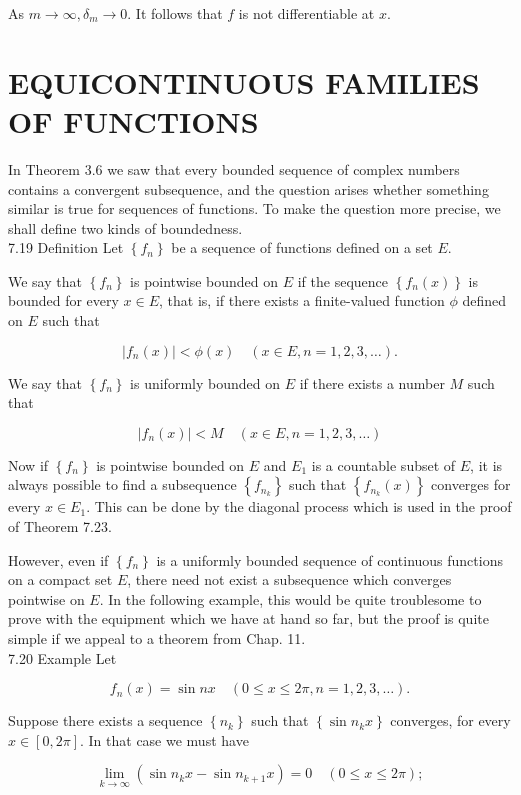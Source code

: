 \documentclass[10pt]{article}
\begin{document}
As $m \rightarrow \infty, \delta_{m} \rightarrow 0$. It follows that $f$ is not differentiable at $x$.

\section*{EQUICONTINUOUS FAMILIES OF FUNCTIONS}
In Theorem 3.6 we saw that every bounded sequence of complex numbers contains a convergent subsequence, and the question arises whether something similar is true for sequences of functions. To make the question more precise, we shall define two kinds of boundedness.\\
7.19 Definition Let $\left\{f_{n}\right\}$ be a sequence of functions defined on a set $E$.

We say that $\left\{f_{n}\right\}$ is pointwise bounded on $E$ if the sequence $\left\{f_{n}(x)\right\}$ is bounded for every $x \in E$, that is, if there exists a finite-valued function $\phi$ defined on $E$ such that

$$
\left|f_{n}(x)\right|<\phi(x) \quad(x \in E, n=1,2,3, \ldots) .
$$

We say that $\left\{f_{n}\right\}$ is uniformly bounded on $E$ if there exists a number $M$ such that

$$
\left|f_{n}(x)\right|<M \quad(x \in E, n=1,2,3, \ldots)
$$

Now if $\left\{f_{n}\right\}$ is pointwise bounded on $E$ and $E_{1}$ is a countable subset of $E$, it is always possible to find a subsequence $\left\{f_{n_{k}}\right\}$ such that $\left\{f_{n_{k}}(x)\right\}$ converges for every $x \in E_{1}$. This can be done by the diagonal process which is used in the proof of Theorem 7.23.

However, even if $\left\{f_{n}\right\}$ is a uniformly bounded sequence of continuous functions on a compact set $E$, there need not exist a subsequence which converges pointwise on $E$. In the following example, this would be quite troublesome to prove with the equipment which we have at hand so far, but the proof is quite simple if we appeal to a theorem from Chap. 11.\\
7.20 Example Let

$$
f_{n}(x)=\sin n x \quad(0 \leq x \leq 2 \pi, n=1,2,3, \ldots) .
$$

Suppose there exists a sequence $\left\{n_{k}\right\}$ such that $\left\{\sin n_{k} x\right\}$ converges, for every $x \in[0,2 \pi]$. In that case we must have

$$
\lim _{k \rightarrow \infty}\left(\sin n_{k} x-\sin n_{k+1} x\right)=0 \quad(0 \leq x \leq 2 \pi) ;
$$
\end{document}
